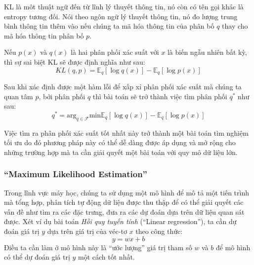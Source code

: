         KL là môt thuật ngữ đến từ lĩnh lý thuyết thông tin, nó còn có tên gọi khác là entropy tương đối. Nói theo ngôn ngữ lý thuyết thông tin, nó đo lượng trung bình thông tin thêm vào nếu chúng ta mã hóa thông tin của phân bố $q$  thay cho mã hóa thông tin phân bố $p$.

        Nếu $p(x)$ và $q(x)$ là hai phân phối xác suất với $x$ là biến ngẫu nhiên bất kỳ, thì sự sai biệt KL sẽ được định nghĩa như sau:
        \begin{equation}
        \label{KLD}
            KL(q,p) = \mathbb{E}_q[\log q(x)] - \mathbb{E}_q[\log p(x)]    
        \end{equation}
        

        Sau khi xác định được một hàm lỗi để xấp xỉ phân phối xác suất mà chúng ta quan tâm $p$,  bởi phân phối $q$ thì bài toán sẽ trở thành việc tìm phân phối $q^*$ như sau:
        $$q^* = \text{arg}_{q\in\mathcal{F}} \text{min}\mathbb{E}_q[\log q(x)] - \mathbb{E}_q[\log p(x)] $$

        Việc tìm ra phân phối xác suất tốt nhất này trở thành một bài toán tìm nghiệm tối ưu do đó phương pháp này  có thể dễ dàng được áp dụng và mở rộng cho những trường hợp mà ta cần giải quyết một bài toán với quy mô dữ liệu lớn. 
        
        
            

        \subsubsection{ ``Maximum Likelihood Estimation''}

        Trong lĩnh vực máy học, chúng ta sử dụng một mô hình để mô tả một tiến trình mà tổng hợp,
        phân tích tự động dữ liệu được thu thập để có thể giải quyết các vấn đề như tìm ra các đặc trưng,
        đưa ra các dự đoán dựa trên dữ liệu quan sát được.
        Xét ví dụ bài toán \textit{Hồi quy tuyến tính} (``Linear regression''),
        ta cần dự đoán giá trị $y$ dựa trên giá trị của véc-tơ $x$ theo công thức:
        \begin{equation}
        \label{equal_LR}
            y = wx + b
        \end{equation}
        Điều ta cần làm ở mô hình này là ``ước lượng'' giá trị tham số $w$ và $b$
        để mô hình có thể dự đoán giá trị $y$ một cách tốt nhất. 
        
